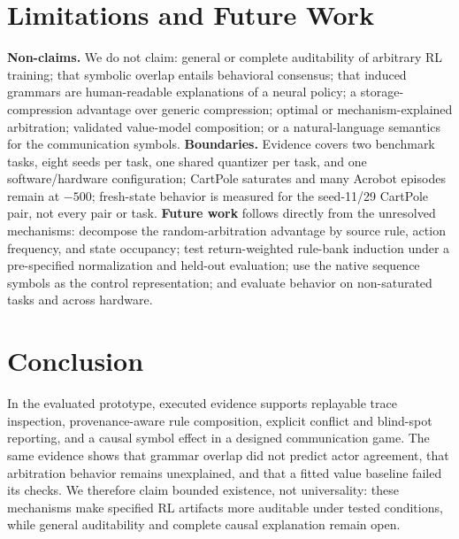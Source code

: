 \documentclass[11pt]{article}
\begin{document}
\section{Limitations and Future Work}
\label{sec:claims}
\textbf{Non-claims.} We do not claim: general or complete auditability of arbitrary RL training;
that symbolic overlap entails behavioral consensus; that induced grammars are human-readable
explanations of a neural policy; a storage-compression advantage over generic compression; optimal
or mechanism-explained arbitration; validated value-model composition; or a natural-language
semantics for the communication symbols. \textbf{Boundaries.} Evidence covers two benchmark tasks,
eight seeds per task, one shared quantizer per task, and one software/hardware configuration;
CartPole saturates and many Acrobot episodes remain at $-500$; fresh-state behavior is measured for
the seed-11/29 CartPole pair, not every pair or task. \textbf{Future work} follows directly from
the unresolved mechanisms: decompose the random-arbitration advantage by source rule, action
frequency, and state occupancy; test return-weighted rule-bank induction under a pre-specified
normalization and held-out evaluation; use the native sequence symbols as the control
representation; and evaluate behavior on non-saturated tasks and across hardware.

\section{Conclusion}
In the evaluated prototype, executed evidence supports replayable trace inspection,
provenance-aware rule composition, explicit conflict and blind-spot reporting, and a causal symbol
effect in a designed communication game. The same evidence shows that grammar overlap did not
predict actor agreement, that arbitration behavior remains unexplained, and that a fitted value
baseline failed its checks. We therefore claim bounded existence, not universality: these
mechanisms make specified RL artifacts more auditable under tested conditions, while general
auditability and complete causal explanation remain open.
\end{document}
